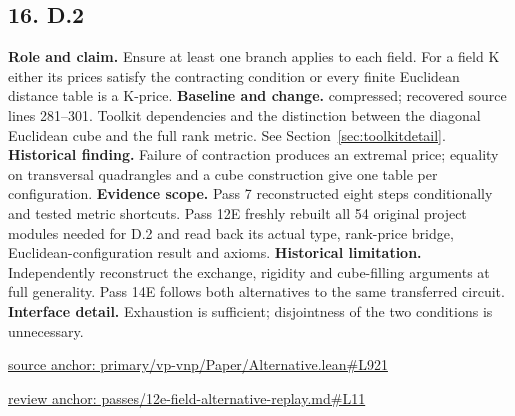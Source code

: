 \documentclass[11pt,letterpaper]{article}
\theoremstyle{definition}\newtheorem{definition}[theorem]{Definition}\newtheorem{example}[theorem]{Example}
\theoremstyle{remark}\newtheorem{remark}[theorem]{Remark}
\begin{document}
\subsection*{16. D.2}
\textbf{Role and claim.} Ensure at least one branch applies to each field. For a field K either its prices satisfy the contracting condition or every finite Euclidean distance table is a K-price.
\textbf{Baseline and change.} compressed; recovered source lines 281--301. Toolkit dependencies and the distinction between the diagonal Euclidean cube and the full rank metric. See Section~\ref{sec:toolkitdetail}.
\textbf{Historical finding.} Failure of contraction produces an extremal price; equality on transversal quadrangles and a cube construction give one table per configuration.
\textbf{Evidence scope.} Pass 7 reconstructed eight steps conditionally and tested metric shortcuts. Pass 12E freshly rebuilt all 54 original project modules needed for D.2 and read back its actual type, rank-price bridge, Euclidean-configuration result and axioms.
\textbf{Historical limitation.} Independently reconstruct the exchange, rigidity and cube-filling arguments at full generality. Pass 14E follows both alternatives to the same transferred circuit.
\textbf{Interface detail.} Exhaustion is sufficient; disjointness of the two conditions is unnecessary.
\par\href{https://github.com/nousentllc/VP-VNP-Review/blob/8a7976933b6b2b4ffda1ad3a0dfb5fc6b6f023e8/primary/vp-vnp/Paper/Alternative.lean\#L921}{source anchor: primary/vp-vnp/Paper/Alternative.lean\#L921}
\par\href{https://github.com/nousentllc/VP-VNP-Review/blob/8a7976933b6b2b4ffda1ad3a0dfb5fc6b6f023e8/passes/12e-field-alternative-replay.md\#L11}{review anchor: passes/12e-field-alternative-replay.md\#L11}
\goodbreak
\end{document}
